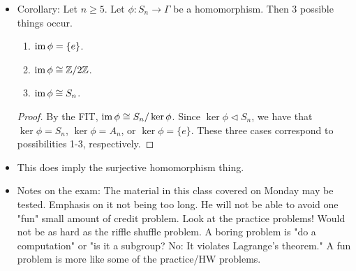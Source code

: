 \documentclass[../notes.tex]{subfiles}
\begin{document}
\begin{itemize}
\begin{itemize}
    \end{itemize}
    \item Corollary: Let $n\geq 5$. Let $\phi:S_n\to\Gamma$ be a homomorphism. Then 3 possible things occur.
    \begin{enumerate}
        \item $\operatorname{im}\phi=\{e\}$.
        \item $\operatorname{im}\phi\cong\mathbb{Z}/2\mathbb{Z}$.
        \item $\operatorname{im}\phi\cong S_n$.
    \end{enumerate}
    \begin{proof}
        By the FIT, $\operatorname{im}\phi\cong S_n/\ker\phi$. Since $\ker\phi\triangleleft S_n$, we have that $\ker\phi=S_n$, $\ker\phi=A_n$, or $\ker\phi=\{e\}$. These three cases correspond to possibilities 1-3, respectively.
    \end{proof}
    \item This does imply the surjective homomorphism thing.
    \item Notes on the exam: The material in this class covered on Monday may be tested. Emphasis on it not being too long. He will not be able to avoid one "fun" small amount of credit problem. Look at the practice problems! Would not be as hard as the riffle shuffle problem. A boring problem is "do a computation" or "is it a subgroup? No: It violates Lagrange's theorem." A fun problem is more like some of the practice/HW problems.
\end{itemize}
\end{document}
